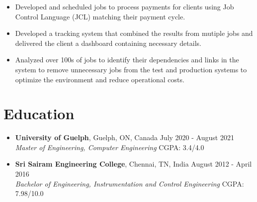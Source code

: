 \documentclass{article}
\begin{document}
\begin{itemize}
\begin{itemize}
        		\item Developed and scheduled jobs to process payments for clients using Job Control Language (JCL) matching their payment cycle.
        		\item Developed a tracking system that combined the results from mutiple jobs and delivered the client a dashboard containing necessary details.
        		\item Analyzed over 100s of jobs to identify their dependencies and links in the system to remove unnecessary jobs from the test and production systems to optimize the environment and reduce operational costs.
		\end{itemize}
	\end{itemize}
	
	
	\section*{Education \hrulefill\vspace{-.3\baselineskip}}
	\begin{itemize}
		\item \textbf{University of Guelph}, Guelph, ON, Canada \hfill July 2020 - August 2021\\
			  \textit{Master of Engineering, Computer Engineering} \hfill	CGPA: 3.4/4.0\\
		\item \textbf{Sri Sairam Engineering College}, Chennai, TN, India \hfill August 2012 - April 2016\\
	\textit{Bachelor of Engineering, Instrumentation and Control Engineering} \hfill	CGPA: 7.98/10.0\\
	\end{itemize}
	

	
	
\end{document}
